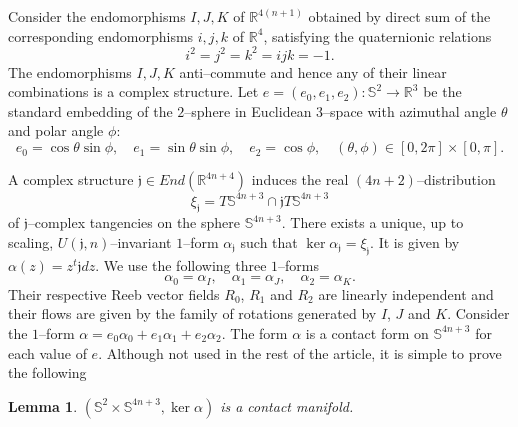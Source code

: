 \documentclass[10pt]{amsart}
\newtheorem{lemma}[proposition]{Lemma}
\begin{document}
\noindent Consider the endomorphisms $I,J,K$ of ${\mathbb{R}}^{4(n+1)}$ obtained by direct sum of the corresponding endomorphisms $i,j,k$ of ${\mathbb{R}}^4$, satisfying the quaternionic relations
$$i^2=j^2=k^2=ijk=-1.$$
The endomorphisms $I,J,K$ anti--commute and hence any of their linear combinations is a complex structure. Let $e=(e_0,e_1,e_2):{\mathbb{S}}^2\longrightarrow{\mathbb{R}}^3$ be the standard embedding of the $2$--sphere in Euclidean $3$--space with azimuthal angle $\theta$ and polar angle $\phi$:
$$e_0=\cos\theta\sin\phi,\quad e_1=\sin\theta\sin\phi,\quad e_2=\cos\phi,\quad (\theta,\phi)\in[0,2\pi]\times[0,\pi].$$

\noindent A complex structure ${\mathfrak{j}}\in End({\mathbb{R}}^{4n+4})$ induces the real $(4n+2)$--distribution
$$\xi_{\mathfrak{j}}=T{\mathbb{S}}^{4n+3}\cap{\mathfrak{j}} T{\mathbb{S}}^{4n+3}$$ of ${\mathfrak{j}}$--complex tangencies on the sphere ${\mathbb{S}}^{4n+3}$. There exists a unique, up to scaling, $U({\mathfrak{j}},n)$--invariant $1$--form $\alpha_{\mathfrak{j}}$ such that $\ker\alpha_{\mathfrak{j}}=\xi_{\mathfrak{j}}$. It is given by $\alpha(z)=z^t{\mathfrak{j}} dz$. We use the following three $1$--forms
$$\alpha_0=\alpha_I,\quad\alpha_1=\alpha_J,\quad \alpha_2=\alpha_K.$$
Their respective Reeb vector fields $R_0$, $R_1$ and $R_2$ are linearly independent and their flows are given by the family of rotations generated by $I$, $J$ and $K$. Consider the $1$--form $\alpha=e_0\alpha_0+e_1\alpha_1+e_2\alpha_2$. The form $\alpha$ is a contact form on ${\mathbb{S}}^{4n+3}$ for each value of $e$. Although not used in the rest of the article, it is simple to prove the following
\begin{lemma}
$({\mathbb{S}}^2\times{\mathbb{S}}^{4n+3},\ker\alpha)$ is a contact manifold.
\end{lemma}
\end{document}
